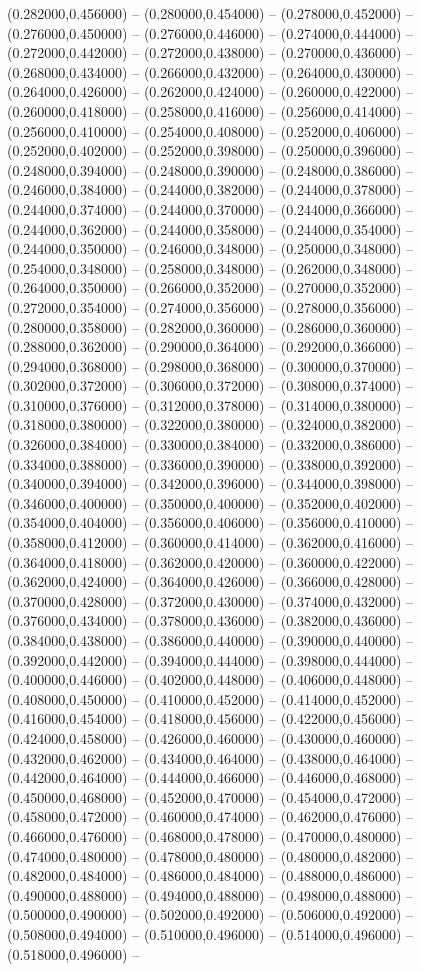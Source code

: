 (0.282000,0.456000) -- (0.280000,0.454000) -- (0.278000,0.452000) -- (0.276000,0.450000) -- (0.276000,0.446000) -- (0.274000,0.444000) -- (0.272000,0.442000) -- (0.272000,0.438000) -- (0.270000,0.436000) -- (0.268000,0.434000) -- (0.266000,0.432000) -- (0.264000,0.430000) -- (0.264000,0.426000) -- (0.262000,0.424000) -- (0.260000,0.422000) -- (0.260000,0.418000) -- (0.258000,0.416000) -- (0.256000,0.414000) -- (0.256000,0.410000) -- (0.254000,0.408000) -- (0.252000,0.406000) -- (0.252000,0.402000) -- (0.252000,0.398000) -- (0.250000,0.396000) -- (0.248000,0.394000) -- (0.248000,0.390000) -- (0.248000,0.386000) -- (0.246000,0.384000) -- (0.244000,0.382000) -- (0.244000,0.378000) -- (0.244000,0.374000) -- (0.244000,0.370000) -- (0.244000,0.366000) -- (0.244000,0.362000) -- (0.244000,0.358000) -- (0.244000,0.354000) -- (0.244000,0.350000) -- (0.246000,0.348000) -- (0.250000,0.348000) -- (0.254000,0.348000) -- (0.258000,0.348000) -- (0.262000,0.348000) -- (0.264000,0.350000) -- (0.266000,0.352000) -- (0.270000,0.352000) -- (0.272000,0.354000) -- (0.274000,0.356000) -- (0.278000,0.356000) -- (0.280000,0.358000) -- (0.282000,0.360000) -- (0.286000,0.360000) -- (0.288000,0.362000) -- (0.290000,0.364000) -- (0.292000,0.366000) -- (0.294000,0.368000) -- (0.298000,0.368000) -- (0.300000,0.370000) -- (0.302000,0.372000) -- (0.306000,0.372000) -- (0.308000,0.374000) -- (0.310000,0.376000) -- (0.312000,0.378000) -- (0.314000,0.380000) -- (0.318000,0.380000) -- (0.322000,0.380000) -- (0.324000,0.382000) -- (0.326000,0.384000) -- (0.330000,0.384000) -- (0.332000,0.386000) -- (0.334000,0.388000) -- (0.336000,0.390000) -- (0.338000,0.392000) -- (0.340000,0.394000) -- (0.342000,0.396000) -- (0.344000,0.398000) -- (0.346000,0.400000) -- (0.350000,0.400000) -- (0.352000,0.402000) -- (0.354000,0.404000) -- (0.356000,0.406000) -- (0.356000,0.410000) -- (0.358000,0.412000) -- (0.360000,0.414000) -- (0.362000,0.416000) -- (0.364000,0.418000) -- (0.362000,0.420000) -- (0.360000,0.422000) -- (0.362000,0.424000) -- (0.364000,0.426000) -- (0.366000,0.428000) -- (0.370000,0.428000) -- (0.372000,0.430000) -- (0.374000,0.432000) -- (0.376000,0.434000) -- (0.378000,0.436000) -- (0.382000,0.436000) -- (0.384000,0.438000) -- (0.386000,0.440000) -- (0.390000,0.440000) -- (0.392000,0.442000) -- (0.394000,0.444000) -- (0.398000,0.444000) -- (0.400000,0.446000) -- (0.402000,0.448000) -- (0.406000,0.448000) -- (0.408000,0.450000) -- (0.410000,0.452000) -- (0.414000,0.452000) -- (0.416000,0.454000) -- (0.418000,0.456000) -- (0.422000,0.456000) -- (0.424000,0.458000) -- (0.426000,0.460000) -- (0.430000,0.460000) -- (0.432000,0.462000) -- (0.434000,0.464000) -- (0.438000,0.464000) -- (0.442000,0.464000) -- (0.444000,0.466000) -- (0.446000,0.468000) -- (0.450000,0.468000) -- (0.452000,0.470000) -- (0.454000,0.472000) -- (0.458000,0.472000) -- (0.460000,0.474000) -- (0.462000,0.476000) -- (0.466000,0.476000) -- (0.468000,0.478000) -- (0.470000,0.480000) -- (0.474000,0.480000) -- (0.478000,0.480000) -- (0.480000,0.482000) -- (0.482000,0.484000) -- (0.486000,0.484000) -- (0.488000,0.486000) -- (0.490000,0.488000) -- (0.494000,0.488000) -- (0.498000,0.488000) -- (0.500000,0.490000) -- (0.502000,0.492000) -- (0.506000,0.492000) -- (0.508000,0.494000) -- (0.510000,0.496000) -- (0.514000,0.496000) -- (0.518000,0.496000) -- 